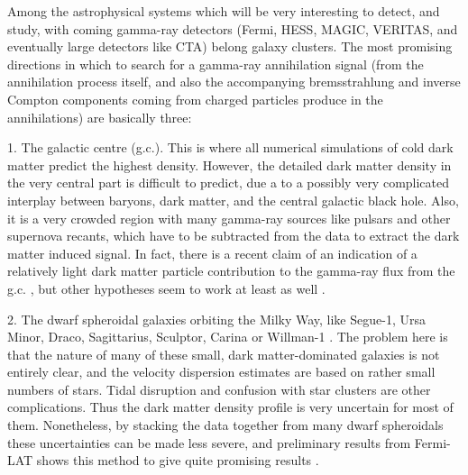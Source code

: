 \documentclass[10pt,aps,pra,reprint,amsmath,amsfonts,amssymb,showpacs]{revtex4-1}
\begin{document}
Among the astrophysical systems which will be very interesting to
detect, and study, with coming gamma-ray detectors (Fermi, HESS,
MAGIC, VERITAS, and eventually large detectors like CTA) belong galaxy
clusters. The most promising directions in which to search for a
gamma-ray annihilation signal (from the annihilation process itself,
and also the accompanying bremsstrahlung and inverse Compton
components coming from charged particles produce in the annihilations)
are basically three:

1. The galactic centre (g.c.). This is where all numerical simulations
of cold dark matter predict the highest density. However, the detailed
dark matter density in the very central part is difficult to predict,
due a to a possibly very complicated interplay between baryons, dark
matter, and the central galactic black hole. Also, it is a very
crowded region with many gamma-ray sources like pulsars and other
supernova recants, which have to be subtracted from the data to
extract the dark matter induced signal. In fact, there is a recent
claim of an indication of a relatively light dark matter particle
contribution to the gamma-ray flux from the
g.c. \cite{2010arXiv1010.2752H}, but other hypotheses seem to work at
least as well \cite{2010arXiv1012.5839B}.

2. The dwarf spheroidal galaxies orbiting the Milky Way, like Segue-1,
Ursa Minor, Draco, Sagittarius, Sculptor, Carina or Willman-1
\cite{2009JCAP...01..016B,2010ApJ...720.1174A,2010JCAP...01..031S,2010JCAP...01..031S}. The
problem here is that the nature of many of these small, dark
matter-dominated galaxies is not entirely clear, and the velocity
dispersion estimates are based on rather small numbers of stars. Tidal
disruption and confusion with star clusters are other
complications. Thus the dark matter density profile is very uncertain
for most of them. Nonetheless, by stacking the data together from many
dwarf spheroidals these uncertainties can be made less severe, and
preliminary results from Fermi-LAT shows this method to give quite
promising results \cite{garde}.
\end{document}
